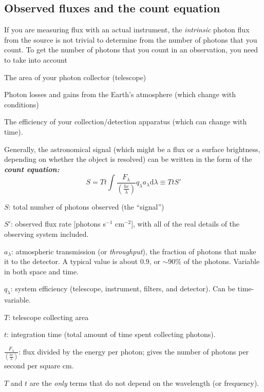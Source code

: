 \documentclass[12pt]{article}
\begin{document}
\subsection*{Observed fluxes and the count equation}
If you are measuring flux with an actual instrument,
the \emph{intrinsic} photon flux from the source is not
trivial to determine from the number of photons that you count.
To get the number of photons that you count in an observation,
you need to take into account
\begin{itemize*}
    \item The area of your photon collector (telescope)
    \item Photon losses and gains from the Earth's atmosphere
    (which change with conditions)
    \item The efficiency of your collection/detection
    apparatus (which can change with time).
\end{itemize*}
Generally, the astronomical signal (which might be a flux or a
surface brightness, depending on whether the object is resolved)
can be written in the form of the \emph{\textbf{count equation:}}
    $$ S = Tt \int \frac{F_{\lambda}}
    {\left(\frac{hc}{\lambda}\right)}q_{\lambda}
    a_{\lambda}\textrm{d}\lambda \equiv TtS' $$
    \begin{itemize*}
        \item $S$: total number of photons observed (the ``signal'')
        \item $S'$: observed flux rate [photons s$^{-1}$ cm$^{-2}$],
            with all of the real details of the observing system included.
        \item $a_{\lambda}$: atmospheric transmission
            (or \emph{throughput}), the fraction of photons that
            make it to the detector.
            A typical value is about 0.9, or $\sim$90\% of the photons.
            Variable in both space and time.
        \item $q_{\lambda}$: system efficiency
            (telescope, instrument, filters, and detector). Can be
            time-variable.
        \item $T$: telescope collecting area
        \item $t$: integration time
            (total amount of time spent collecting photons).
        \item $\frac{F_{\lambda}}{\left(\frac{hc}{\lambda}\right)}$:
            flux divided by the energy per photon;
            gives the number of photons per second per square cm.
    \end{itemize*}
$T$ and $t$ are the \emph{only} terms that do not depend on
the wavelength (or frequency).
\end{document}
